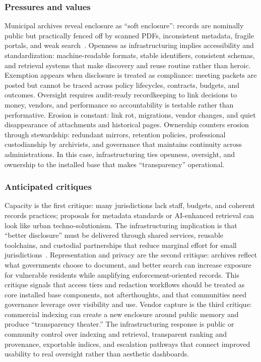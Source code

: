 \documentclass[acmsmall,screen]{acmart}
\begin{document}
\subsubsection*{Pressures and values}
Municipal archives reveal enclosure as ``soft enclosure'': records are nominally public but practically fenced off by scanned PDFs, inconsistent metadata, fragile portals, and weak search~\cite{brownCouncilDataProject2021,fuNaturalLanguageProcessing2024}. Openness as infrastructuring implies accessibility and standardization: machine-readable formats, stable identifiers, consistent schemas, and retrieval systems that make discovery and reuse routine rather than heroic. Exemption appears when disclosure is treated as compliance: meeting packets are posted but cannot be traced across policy lifecycles, contracts, budgets, and outcomes. Oversight requires audit-ready recordkeeping to link decisions to money, vendors, and performance so accountability is testable rather than performative. Erosion is constant: link rot, migrations, vendor changes, and quiet disappearance of attachments and historical pages. Ownership counters erosion through stewardship: redundant mirrors, retention policies, professional custodianship by archivists, and governance that maintains continuity across administrations. In this case, infrastructuring ties openness, oversight, and ownership to the installed base that makes ``transparency'' operational.

\subsubsection*{Anticipated critiques}
Capacity is the first critique: many jurisdictions lack staff, budgets, and coherent records practices; proposals for metadata standards or AI-enhanced retrieval can look like urban techno-solutionism. The infrastructuring implication is that ``better disclosure'' must be delivered through shared services, reusable toolchains, and custodial partnerships that reduce marginal effort for small jurisdictions~\cite{warrenRequestAtlasSupportingSlow2025}. Representation and privacy are the second critique: archives reflect what governments choose to document, and better search can increase exposure for vulnerable residents while amplifying enforcement-oriented records. This critique signals that access tiers and redaction workflows should be treated as core installed base components, not afterthoughts, and that communities need governance leverage over visibility and use. Vendor capture is the third critique: commercial indexing can create a new enclosure around public memory and produce ``transparency theater.'' The infrastructuring response is public or community control over indexing and retrieval, transparent ranking and provenance, exportable indices, and escalation pathways that connect improved usability to real oversight rather than aesthetic dashboards.
\end{document}
